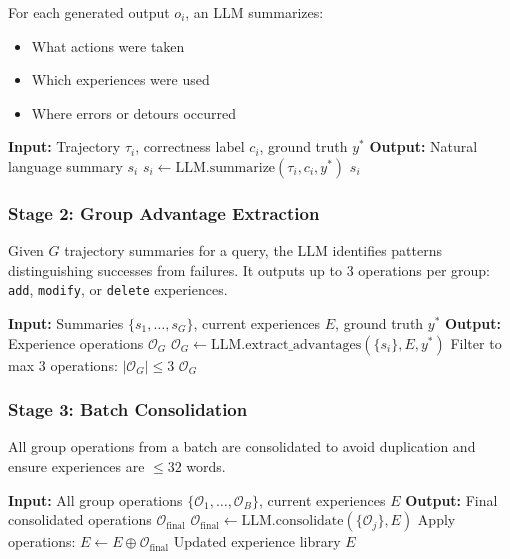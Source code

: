 For each generated output $o_i$, an LLM summarizes:
\begin{itemize}
\item What actions were taken
\item Which experiences were used
\item Where errors or detours occurred
\end{itemize}

\begin{algorithm}[H]
\caption{Trajectory Summarization}
\begin{algorithmic}[1]
\STATE \textbf{Input:} Trajectory $\tau_i$, correctness label $c_i$, ground truth $y^*$
\STATE \textbf{Output:} Natural language summary $s_i$
\STATE $s_i \leftarrow \text{LLM.summarize}(\tau_i, c_i, y^*)$
\RETURN $s_i$
\end{algorithmic}
\end{algorithm}

\subsubsection{Stage 2: Group Advantage Extraction}

Given $G$ trajectory summaries for a query, the LLM identifies patterns distinguishing successes from failures. It outputs up to 3 operations per group: \texttt{add}, \texttt{modify}, or \texttt{delete} experiences.

\begin{algorithm}[H]
\caption{Group Advantage Extraction}
\begin{algorithmic}[1]
\STATE \textbf{Input:} Summaries $\{s_1, \ldots, s_G\}$, current experiences $E$, ground truth $y^*$
\STATE \textbf{Output:} Experience operations $\mathcal{O}_G$
\STATE $\mathcal{O}_G \leftarrow \text{LLM.extract\_advantages}(\{s_i\}, E, y^*)$
\STATE Filter to max 3 operations: $|\mathcal{O}_G| \leq 3$
\RETURN $\mathcal{O}_G$
\end{algorithmic}
\end{algorithm}

\subsubsection{Stage 3: Batch Consolidation}

All group operations from a batch are consolidated to avoid duplication and ensure experiences are $\leq 32$ words.

\begin{algorithm}[H]
\caption{Batch Consolidation}
\begin{algorithmic}[1]
\STATE \textbf{Input:} All group operations $\{\mathcal{O}_1, \ldots, \mathcal{O}_B\}$, current experiences $E$
\STATE \textbf{Output:} Final consolidated operations $\mathcal{O}_{\text{final}}$
\STATE $\mathcal{O}_{\text{final}} \leftarrow \text{LLM.consolidate}(\{\mathcal{O}_j\}, E)$
\STATE Apply operations: $E \leftarrow E \oplus \mathcal{O}_{\text{final}}$
\RETURN Updated experience library $E$
\end{algorithmic}
\end{algorithm}


